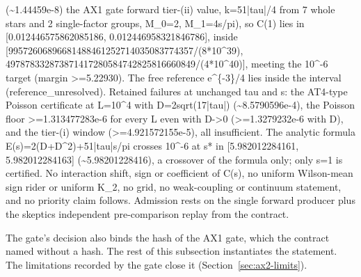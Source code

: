 \begin{gatequote}
(\textasciitilde{}1.44459e-8) the AX1 gate forward tier-(ii) value,
k\textquotesingle{}=51|tau|/4 from 7 whole stars and 2 single-factor groups,
M\_0=2, M\_1=4s/pi), so C(1) lies in [0.012446575862085186,
0.012446958321846786], inside
[99572606896681488461252714035083774357/(8*10\textasciicircum{}39),
497878332873871417280584742825816660849/(4*10\textasciicircum{}40)], meeting
the 10\textasciicircum{}-6 target (margin >=5.22930). The free reference
e\textasciicircum{}\{-3\}/4 lies inside the interval (reference\_unresolved).
Retained failures at unchanged tau and s: the AT4-type Poisson certificate at
L=10\textasciicircum{}4 with D=2sqrt(17|tau|) (\textasciitilde{}8.5790596e-4),
the Poisson floor >=1.313477283e-6 for every L even with D->0 (>=1.3279232e-6
with D\textquotesingle{}), and the tier-(i) window (>=4.921572155e-5), all
insufficient. The analytic formula
E\textquotesingle{}(s)=2(D\textquotesingle{}+D\textquotesingle{}\textasciicircum{}2)+51|tau|s/pi
crosses 10\textasciicircum{}-6 at s* in [5.982012284161, 5.982012284163]
(\textasciitilde{}5.98201228416), a crossover of the formula only; only s=1 is
certified. No interaction shift, sign or coefficient of C(s), no uniform
Wilson-mean sign rider or uniform K\_2, no grid, no weak-coupling or continuum
statement, and no priority claim follows. Admission rests on the single
forward producer plus the skeptic\textquotesingle{}s independent
pre-comparison replay from the contract.
\end{gatequote}
The gate's decision also binds the hash of the AX1 gate, which the contract
named without a hash. The rest of this subsection instantiates the statement.
The limitations recorded by the gate close it (Section~\ref{sec:ax2-limits}).

